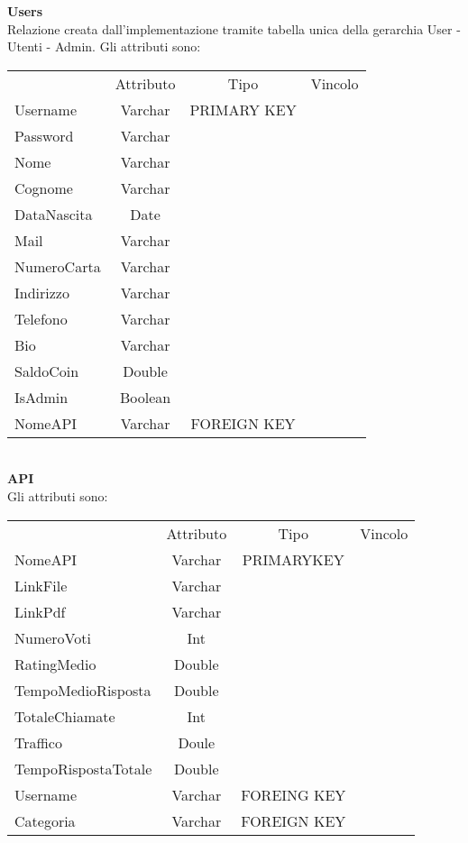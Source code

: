 {{		\textbf{Users}\\
			Relazione creata dall'implementazione tramite tabella unica della gerarchia User - Utenti - Admin. Gli attributi sono:
			\begin{center}
			\begin{tabular}{lccc}
				&Attributo&Tipo&Vincolo\\
				Username&Varchar&PRIMARY KEY\\
				Password&Varchar& \\				
				Nome&Varchar& \\
				Cognome&Varchar& \\
				DataNascita&Date& \\				
				Mail&Varchar& \\
				NumeroCarta&Varchar& \\
				Indirizzo&Varchar& \\
				Telefono&Varchar& \\
				Bio&Varchar& \\
				SaldoCoin&Double& \\
				IsAdmin&Boolean& \\
				NomeAPI&Varchar&FOREIGN KEY\\
			\end{tabular}
			\end{center} \\					
			
		\textbf{API}\\
			Gli attributi sono:
			\begin{center}
			\begin{tabular}{lccc}
				&Attributo&Tipo&Vincolo\\
				NomeAPI&Varchar&PRIMARYKEY\\
				LinkFile&Varchar& \\
				LinkPdf&Varchar& \\
				NumeroVoti&Int& \\
				RatingMedio&Double& \\
				TempoMedioRisposta&Double& \\
				TotaleChiamate&Int& \\
				Traffico&Doule& \\
				TempoRispostaTotale&Double& \\
				Username&Varchar&FOREING KEY\\
				Categoria&Varchar&FOREIGN KEY\\
			\end{tabular}
			\end{center}\\
			
}}
